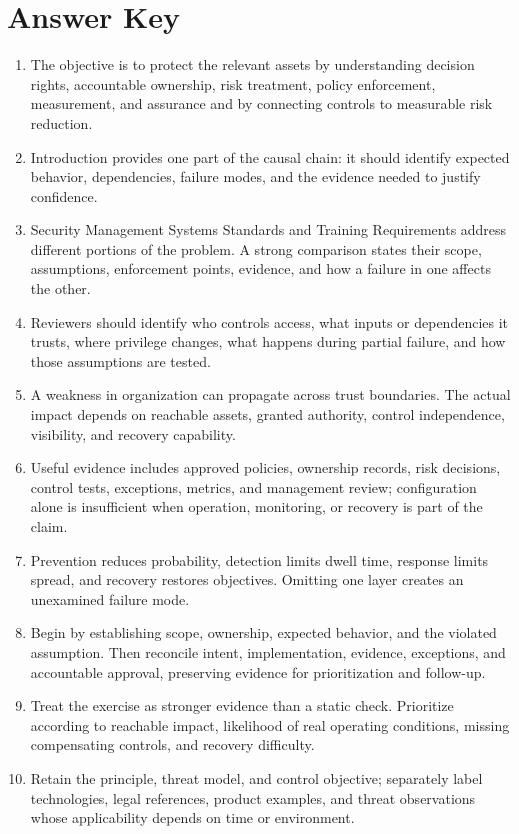 \documentclass[11pt,letterpaper]{article}
\begin{document}
\section*{Answer Key}
\begin{enumerate}
\item The objective is to protect the relevant assets by understanding decision rights, accountable ownership, risk treatment, policy enforcement, measurement, and assurance and by connecting controls to measurable risk reduction.
\item Introduction provides one part of the causal chain: it should identify expected behavior, dependencies, failure modes, and the evidence needed to justify confidence.
\item Security Management Systems Standards and Training Requirements address different portions of the problem. A strong comparison states their scope, assumptions, enforcement points, evidence, and how a failure in one affects the other.
\item Reviewers should identify who controls access, what inputs or dependencies it trusts, where privilege changes, what happens during partial failure, and how those assumptions are tested.
\item A weakness in organization can propagate across trust boundaries. The actual impact depends on reachable assets, granted authority, control independence, visibility, and recovery capability.
\item Useful evidence includes approved policies, ownership records, risk decisions, control tests, exceptions, metrics, and management review; configuration alone is insufficient when operation, monitoring, or recovery is part of the claim.
\item Prevention reduces probability, detection limits dwell time, response limits spread, and recovery restores objectives. Omitting one layer creates an unexamined failure mode.
\item Begin by establishing scope, ownership, expected behavior, and the violated assumption. Then reconcile intent, implementation, evidence, exceptions, and accountable approval, preserving evidence for prioritization and follow-up.
\item Treat the exercise as stronger evidence than a static check. Prioritize according to reachable impact, likelihood of real operating conditions, missing compensating controls, and recovery difficulty.
\item Retain the principle, threat model, and control objective; separately label technologies, legal references, product examples, and threat observations whose applicability depends on time or environment.
\end{enumerate}
\end{document}
